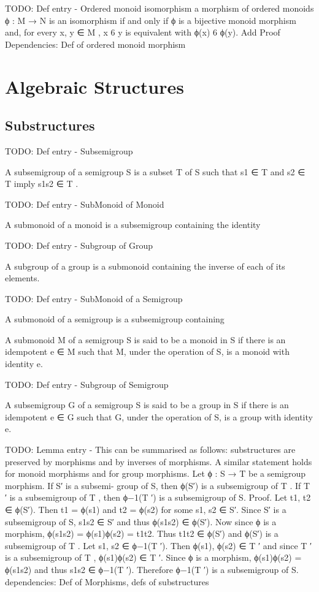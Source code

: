 TODO: Def entry - Ordered monoid isomorphism
a morphism of ordered monoids ϕ : M → N is an isomorphism if and only if ϕ is
a bijective monoid morphism and, for every x, y ∈ M , x 6 y is equivalent with
ϕ(x) 6 ϕ(y).
Add Proof
Dependencies: Def of ordered monoid morphism 

\chapter {Algebraic Structures}

\section {Substructures}

TODO: Def entry - Subsemigroup 

A subsemigroup of a semigroup S is a subset T of S such that s1 ∈ T and s2 ∈ T
imply s1s2 ∈ T .

TODO: Def entry - SubMonoid of Monoid

A submonoid of a monoid is a subsemigroup containing the
identity

TODO: Def entry - Subgroup of Group

 A subgroup of a group is a submonoid containing the inverse of each
of its elements.

TODO: Def entry - SubMonoid of a Semigroup

A submonoid of a semigroup is a subsemigroup containing

A submonoid M of a semigroup S is said to be a monoid in S if there is
an idempotent e ∈ M such that M, under the operation of S, is a monoid with
identity e.

TODO: Def entry - Subgroup of Semigroup

A subsemigroup G of a semigroup S is said to be a group in S if there is
an idempotent e ∈ G such that G, under the operation of S, is a group with
identity e.

TODO: Lemma entry - 
This can be summarised as follows: substructures are preserved
by morphisms and by inverses of morphisms. A similar statement holds for
monoid morphisms and for group morphisms.
Let ϕ : S → T be a semigroup morphism. If S′ is a subsemi-
group of S, then ϕ(S′) is a subsemigroup of T . If T ′ is a subsemigroup of T ,
then ϕ−1(T ′) is a subsemigroup of S.
Proof. Let t1, t2 ∈ ϕ(S′). Then t1 = ϕ(s1) and t2 = ϕ(s2) for some s1, s2 ∈ S′.
Since S′ is a subsemigroup of S, s1s2 ∈ S′ and thus ϕ(s1s2) ∈ ϕ(S′). Now since
ϕ is a morphism, ϕ(s1s2) = ϕ(s1)ϕ(s2) = t1t2. Thus t1t2 ∈ ϕ(S′) and ϕ(S′) is
a subsemigroup of T .
Let s1, s2 ∈ ϕ−1(T ′). Then ϕ(s1), ϕ(s2) ∈ T ′ and since T ′ is a subsemigroup
of T , ϕ(s1)ϕ(s2) ∈ T ′. Since ϕ is a morphism, ϕ(s1)ϕ(s2) = ϕ(s1s2) and thus
s1s2 ∈ ϕ−1(T ′). Therefore ϕ−1(T ′) is a subsemigroup of S.
dependencies: Def of Morphisms, defs of substructures

